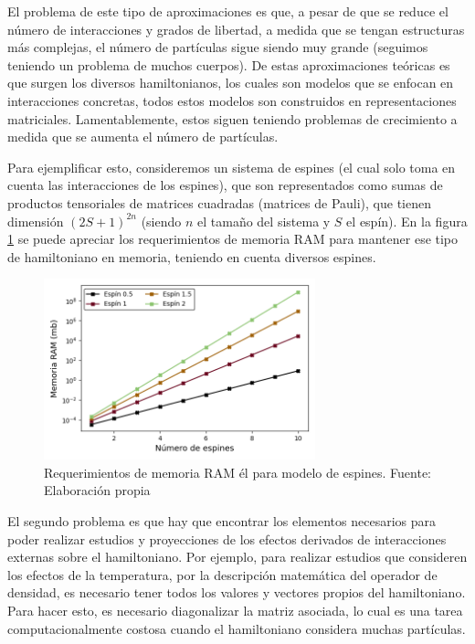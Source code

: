 El problema de este tipo de aproximaciones es que, a pesar de que se reduce el número de interacciones y grados de libertad, a medida que se tengan estructuras más complejas, el número de partículas sigue siendo muy grande (seguimos teniendo un problema de muchos cuerpos). De estas aproximaciones teóricas es que surgen los diversos hamiltonianos, los cuales son modelos que se enfocan en interacciones concretas, todos estos modelos son construidos en representaciones matriciales. Lamentablemente, estos siguen teniendo problemas de crecimiento a medida que se aumenta el número de partículas.

Para ejemplificar esto, consideremos un sistema de espines (el cual solo toma en cuenta las interacciones de los espines), que son representados como sumas de productos tensoriales de matrices cuadradas (matrices de Pauli), que tienen dimensión $(2S+1)^{2n}$ (siendo $n$ el tamaño del sistema y $S$ el espín). En la figura \ref{fig:1000} se puede apreciar los requerimientos de memoria RAM para mantener ese tipo de hamiltoniano en memoria, teniendo en cuenta diversos espines.


\begin{figure}[H]
\centering
\includegraphics[width=0.7\textwidth]{figures/S1/matriz.png}
\caption{\label{fig:1000} Requerimientos de memoria RAM él para modelo de espines. Fuente: Elaboración propia}
\end{figure}

El segundo problema es que hay que encontrar los elementos necesarios para poder realizar estudios y proyecciones de los efectos derivados de interacciones externas sobre el hamiltoniano. Por ejemplo, para realizar estudios que consideren los efectos de la temperatura, por la descripción matemática del operador de densidad, es necesario tener todos los valores y vectores propios del hamiltoniano. Para hacer esto, es necesario diagonalizar la matriz asociada, lo cual es una tarea computacionalmente costosa cuando el hamiltoniano considera muchas partículas. 


